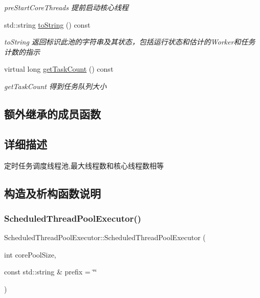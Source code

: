 \begin{DoxyCompactItemize}
\begin{DoxyCompactList}\small\item\em pre\+Start\+Core\+Threads 提前启动核心线程 \end{DoxyCompactList}\item 
std\+::string \hyperlink{classScheduledThreadPoolExecutor_a4a785e058d76dc861a23904d7e1033f0}{to\+String} () const
\begin{DoxyCompactList}\small\item\em to\+String 返回标识此池的字符串及其状态，包括运行状态和估计的\+Worker和任务计数的指示 \end{DoxyCompactList}\item 
virtual long \hyperlink{classScheduledThreadPoolExecutor_a786bc8478d265dfe0288de9397c7f768}{get\+Task\+Count} () const
\begin{DoxyCompactList}\small\item\em get\+Task\+Count 得到任务队列大小 \end{DoxyCompactList}\end{DoxyCompactItemize}
\subsection*{额外继承的成员函数}


\subsection{详细描述}
定时任务调度线程池,最大线程数和核心线程数相等 

\subsection{构造及析构函数说明}
\mbox{\label{classScheduledThreadPoolExecutor_a880b17439bcdcf9b7542925e24033691}} 
\subsubsection{\texorpdfstring{Scheduled\+Thread\+Pool\+Executor()}{ScheduledThreadPoolExecutor()}}
{\footnotesize\ttfamily Scheduled\+Thread\+Pool\+Executor\+::\+Scheduled\+Thread\+Pool\+Executor (\begin{DoxyParamCaption}\item[{int}]{core\+Pool\+Size,  }\item[{const std\+::string \&}]{prefix = {\ttfamily \char`\"{}\char`\"{}} }\end{DoxyParamCaption})\hspace{0.3cm}{\ttfamily [inline]}}



